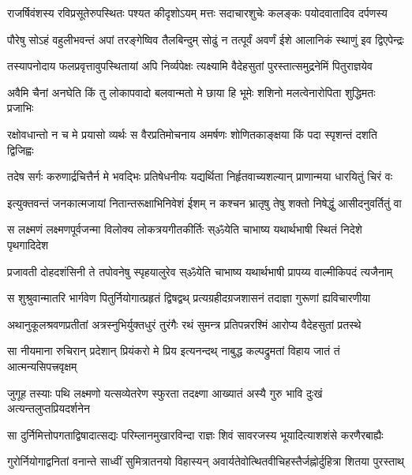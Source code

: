 \twolineshloka
{राजर्षिवंशस्य रविप्रसूतेरुपस्थितः पश्यत कीदृशोऽयम्}
{मत्तः सदाचारशुचेः कलङ्कः पयोदवातादिव दर्पणस्य}%

\twolineshloka
{पौरेषु सोऽहं वहुलीभवन्तं अपां तरङ्गेष्विव तैलबिन्दुम्}
{सोढुं न तत्पूर्वं अवर्णं ईशे आलानिकं स्थाणुं इव द्विएपेन्द्रः}%

\twolineshloka
{तस्यापनोदाय फलप्रवृत्तावुपस्थितायां अपि निर्व्यपेक्षः}
{त्यक्ष्यामि वैदेहसुतां पुरस्तात्समुद्रनेमिं पितुराज्ञयेव}%

\twolineshloka
{अवैमि चैनां अनघेति किं तु लोकापवादो बलवान्मतो मे}
{छाया हि भूमेः शशिनो मलत्वेनारोपिता शुद्धिमतः प्रजाभिः}%

\twolineshloka
{रक्षोवधान्तो न च मे प्रयासो व्यर्थः स वैरप्रतिमोचनाय}
{अमर्षणः शोणितकाङ्क्षया किं पदा स्पृशन्तं दशति द्विजिह्वः}%

\twolineshloka
{तदेष सर्गः करुणार्द्रचित्तैर्न मे भवद्भिः प्रतिषेधनीयः}
{यद्यर्थिता निर्हृतवाच्यशल्यान् प्राणान्मया धारयितुं चिरं वः}%

\twolineshloka
{इत्युक्तवन्तं जनकात्मजायां नितान्तरूक्षाभिनिवेशं ईशम्}
{न कश्चन भ्रातृषु तेषु शक्तो निषेद्धुं आसीदनुवर्तितुं वा}%

\twolineshloka
{स लक्ष्मणं लक्ष्मणपूर्वजन्मा विलोक्य लोकत्रयगीतकीर्तिः}
{स्ॐयेति चाभाष्य यथार्थभाषी स्थितं निदेशे पृथगादिदेश}%

\twolineshloka
{प्रजावती दोहदशंसिनी ते तपोवनेषु स्पृहयालुरेव}
{स्ॐयेति चाभाष्य यथार्थभाषी प्रापय्य वाल्मीकिपदं त्यजैनाम्}%

\twolineshloka
{स शुश्रुवान्मातरि भार्गवेण पितुर्नियोगात्प्रहृतं द्विषद्वथ्}
{प्रत्यग्रहीदग्रजशासनं तदाज्ञा गुरूणां ह्यविचारणीया}%

\twolineshloka
{अथानुकूलश्रवणप्रतीतां अत्रस्नुभिर्युक्तधुरं तुरंगैः}
{रथं सुमन्त्र प्रतिपन्नरश्मिं आरोप्य वैदेहसुतां प्रतस्थे}%

\twolineshloka
{सा नीयमाना रुचिरान् प्रदेशान् प्रियंकरो मे प्रिय इत्यनन्दथ्}
{नाबुद्ध कल्पद्रुमतां विहाय जातं तं आत्मन्यसिपत्त्रवृक्षम्}%

\twolineshloka
{जुगूह तस्याः पथि लक्ष्मणो यत्सव्येतरेण स्फुरता तदक्ष्णा}
{आख्यातं अस्यै गुरु भावि दुःखं अत्यन्तलुप्तप्रियदर्शनेन}%

\twolineshloka
{सा दुर्निमित्तोपगताद्विषादात्सद्यः परिम्लानमुखारविन्दा}
{राज्ञः शिवं सावरजस्य भूयादित्याशशंसे करणैरबाह्यैः}%

\twolineshloka
{गुरोर्नियोगाद्वनितां वनान्ते साध्वीं सुमित्रातनयो विहास्यन्}
{अवार्यतेवोत्थितवीचिहस्तैर्जह्नोर्दुहित्रा शितया पुरस्ताथ्}%

